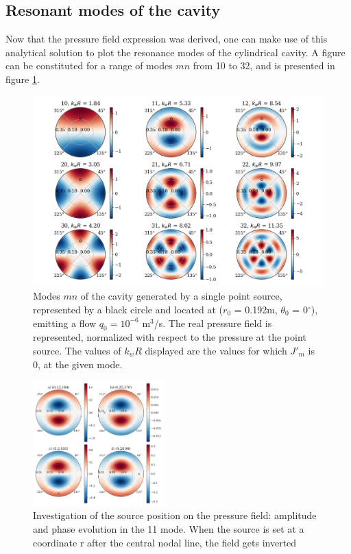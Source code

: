 \documentclass[%
 reprint,
 amsmath,amssymb,
 aip,
]{revtex4-1}
\begin{document}
\subsection{Resonant modes of the cavity}
Now that the pressure field expression was derived, one can make use of this analytical solution to plot the resonance modes of the cylindrical cavity. A figure can be constituted for a range of modes $mn$ from 10 to 32, and is presented in figure \ref{fig:modes}.

\begin{figure}
    \centering
    \includegraphics[width=\textwidth]{figures/modes.png}
    \caption{Modes $mn$ of the cavity generated by a single point source, represented by a black circle and located at ($r_0$ = 0.192m, $\theta_0$ = 0$^\circ$), emitting a flow $q_0 = 10^{-6}$ m$^3$/s. The real pressure field is represented, normalized with respect to the pressure at the point source. The values of $k_w R$ displayed are the values for which $J'_m$ is 0, at the given mode.}
    \label{fig:modes}
\end{figure}


\begin{figure}
    \centering
    \includegraphics[width=0.45\textwidth]{figures/source_pos.png}
    \caption{Investigation of the source position on the pressure field: amplitude and phase evolution in the 11 mode. When the source is set at a coordinate r after the central nodal line, the field gets inverted}
    \label{fig:source_pos}
\end{figure}
\end{document}
